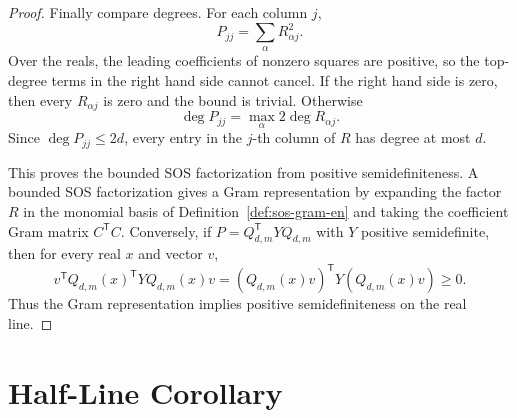 \documentclass[uplatex,dvipdfmx]{jsarticle}
\newcommand{\restateprefix}{}
\theoremstyle{matrixsosdefinition}
\begin{document}
\begin{proof}
  Finally compare degrees.  For each column \(j\),
  \[
    P_{jj}=\sum_\alpha R_{\alpha j}^2.
  \]
  Over the reals, the leading coefficients of nonzero squares are positive, so
  the top-degree terms in the right hand side cannot cancel.  If the right hand
  side is zero, then every \(R_{\alpha j}\) is zero and the bound is trivial.
  Otherwise
  \[
    \deg P_{jj}=\max_\alpha 2\deg R_{\alpha j}.
  \]
  Since \(\deg P_{jj}\le2d\), every entry in the \(j\)-th column of \(R\) has
  degree at most \(d\).

  This proves the bounded SOS factorization from positive semidefiniteness.
  A bounded SOS factorization gives a Gram representation by expanding the
  factor \(R\) in the monomial basis of Definition~\ref{def:sos-gram-en} and
  taking the coefficient Gram matrix \(C^{\mathsf T}C\). Conversely, if
  \(P=Q_{d,m}^{\mathsf T}YQ_{d,m}\) with \(Y\) positive semidefinite, then for
  every real \(x\) and vector \(v\),
  \[
    v^{\mathsf T}Q_{d,m}(x)^{\mathsf T}YQ_{d,m}(x)v
    =(Q_{d,m}(x)v)^{\mathsf T}Y(Q_{d,m}(x)v)\ge0.
  \]
  Thus the Gram representation implies positive semidefiniteness on the real
  line.
\end{proof}

\section{Half-Line Corollary}

{\renewcommand{\restateprefix}{Restated; }\halfLineMarkovLukacs*}
\end{document}
